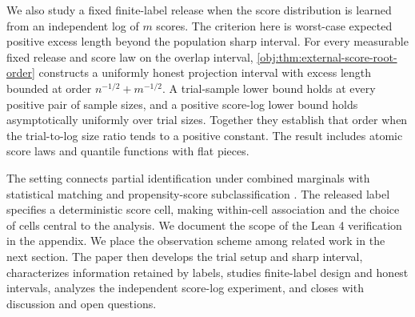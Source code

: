 We also study a fixed finite-label release when the score distribution is learned from an independent log of \(m\) scores. The criterion here is worst-case expected positive excess length beyond the population sharp interval. For every measurable fixed release and score law on the overlap interval, \cref{obj:thm:external-score-root-order} constructs a uniformly honest projection interval with excess length bounded at order \(n^{-1/2}+m^{-1/2}\). A trial-sample lower bound holds at every positive pair of sample sizes, and a positive score-log lower bound holds asymptotically uniformly over trial sizes. Together they establish that order when the trial-to-log size ratio tends to a positive constant. The result includes atomic score laws and quantile functions with flat pieces.

The setting connects partial identification under combined marginals \citep{Manski1990,Tamer2010,Torgovitsky2019} with statistical matching \citep{DOrazio2006,Conti2017} and propensity-score subclassification \citep{Cochran1968,RosenbaumRubin1984}. The released label specifies a deterministic score cell, making within-cell association and the choice of cells central to the analysis. We document the scope of the Lean 4 verification in the appendix. We place the observation scheme among related work in the next section. The paper then develops the trial setup and sharp interval, characterizes information retained by labels, studies finite-label design and honest intervals, analyzes the independent score-log experiment, and closes with discussion and open questions.
